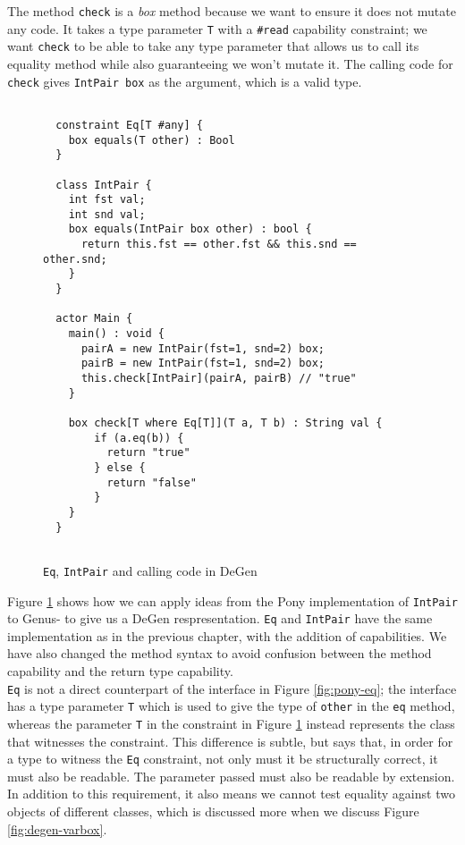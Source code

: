 The method \texttt{check} is a \textit{box} method because we want to ensure it does not mutate any code. It takes a type parameter \texttt{T} with a \texttt{\#read} capability constraint; we want \texttt{check} to be able to take any type parameter that allows us to call its equality method while also guaranteeing we won't mutate it. The calling code for \texttt{check} gives \texttt{IntPair box} as the argument, which is a valid type. \\

\newpage

\begin{figure}[H]
    \centering
    \begin{verbatim}
    
  constraint Eq[T #any] {
    box equals(T other) : Bool
  }
  
  class IntPair {
    int fst val;
    int snd val;
    box equals(IntPair box other) : bool {
      return this.fst == other.fst && this.snd == other.snd;
    }
  }
  
  actor Main {
    main() : void {
      pairA = new IntPair(fst=1, snd=2) box;
      pairB = new IntPair(fst=1, snd=2) box;
      this.check[IntPair](pairA, pairB) // "true"
    }
    
    box check[T where Eq[T]](T a, T b) : String val {
        if (a.eq(b)) {
          return "true"
        } else {
          return "false"
        }
    }
  }
  
    \end{verbatim}
    \caption{\texttt{Eq}, \texttt{IntPair} and calling code in DeGen}
    \label{fig:degen-eq}
\end{figure}

Figure \ref{fig:degen-eq} shows how we can apply ideas from the Pony implementation of \texttt{IntPair} to Genus- to give us a DeGen respresentation. \texttt{Eq} and \texttt{IntPair} have the same implementation as in the previous chapter, with the addition of capabilities. We have also changed the method syntax to avoid confusion between the method capability and the return type capability. \\

\texttt{Eq} is not a direct counterpart of the interface in Figure \ref{fig:pony-eq}; the interface has a type parameter \texttt{T} which is used to give the type of \texttt{other} in the \texttt{eq} method, whereas the parameter \texttt{T} in the constraint in Figure \ref{fig:degen-eq} instead represents the class that witnesses the constraint. This difference is subtle, but says that, in order for a type to witness the \texttt{Eq} constraint, not only must it be structurally correct, it must also be readable. The parameter passed must also be readable by extension. In addition to this requirement, it also means we cannot test equality against two objects of different classes, which is discussed more when we discuss Figure \ref{fig:degen-varbox}. \\

